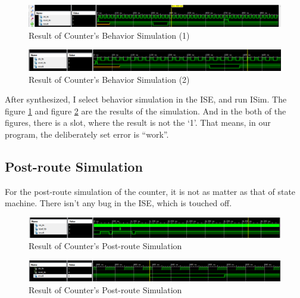 \documentclass{article}
\begin{document}
    \begin{figure}[h!]
        \centering
        \includegraphics[width=1\linewidth]{homework7-5}
        \caption{Result of Counter's Behavior Simulation (1)}
        \label{fig:homework7-5}
    \end{figure}
    \begin{figure}[h!]
        \centering
        \includegraphics[width=1\linewidth]{homework7-6}
        \caption{Result of Counter's Behavior Simulation (2)}
        \label{fig:homework7-6}
    \end{figure}
    
    After synthesized, I select behavior simulation in the ISE, and run ISim. The figure \ref{fig:homework7-5}
    and figure \ref{fig:homework7-6} are the results of the simulation. And in the both of the figures,
    there is a slot, where the result is not the `1'. That means, in our program, the deliberately set error is ``work''.
    
    \subsection{Post-route Simulation}
           

    For the post-route simulation of the counter, it is not as matter as that of state machine.
    There isn't any bug in the ISE, which is touched off.
    
    \begin{figure}
        \centering
        \includegraphics[width=1\linewidth]{homework7-7}
        \caption{Result of Counter's Post-route Simulation}
        \label{fig:homework7-7}
    \end{figure}
    \begin{figure}
        \centering
        \includegraphics[width=1\linewidth]{homework7-8}
        \caption{Result of Counter's Post-route Simulation}
        \label{fig:homework7-8}
    \end{figure}
        
\end{document}
